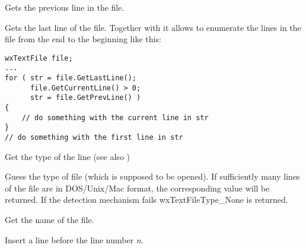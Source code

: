 Gets the previous line in the file.

\label{wxtextfilegetlastline}


Gets the last line of the file. Together with 
 it allows to enumerate the lines
in the file from the end to the beginning like this:

\begin{verbatim}
wxTextFile file;
...
for ( str = file.GetLastLine();
      file.GetCurrentLine() > 0;
      str = file.GetPrevLine() )
{
    // do something with the current line in str
}
// do something with the first line in str
\end{verbatim}

\label{wxtextfilegetlinetype}


Get the type of the line (see also )

\label{wxtextfileguesstype}


Guess the type of file (which is supposed to be opened). If sufficiently
many lines of the file are in DOS/Unix/Mac format, the corresponding value will
be returned. If the detection mechanism fails wxTextFileType\_None is returned.

\label{wxtextfilegetname}


Get the name of the file.

\label{wxtextfileinsertline}


Insert a line before the line number {\it n}.

\label{wxtextfileopen}




